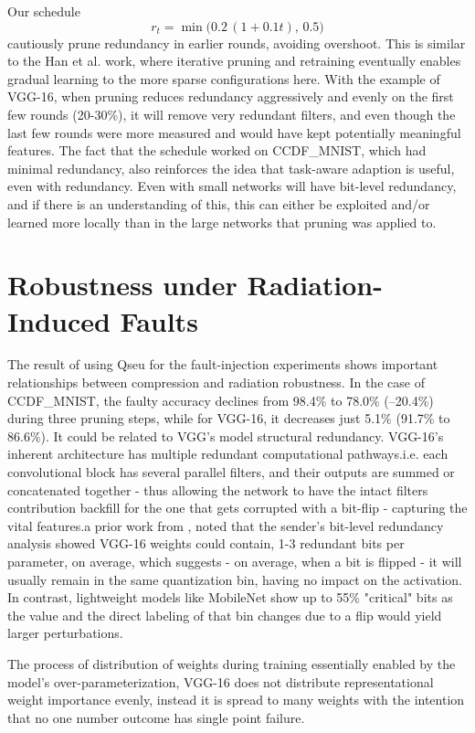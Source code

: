 Our schedule \[r_t = \min\bigl(0.2\,(1+0.1t),\,0.5\bigr)\]cautiously prune redundancy in earlier rounds, avoiding overshoot. This is similar to the Han et al. work, where iterative pruning and retraining eventually enables gradual learning to the more sparse configurations here. With the example of VGG-16, when pruning reduces redundancy aggressively and evenly on the first few rounds (20-30\%), it will remove very redundant filters, and even though the last few rounds were more measured and would have kept potentially meaningful features. The fact that the schedule worked on CCDF\_MNIST, which had minimal redundancy, also reinforces the idea that task-aware adaption is useful, even with redundancy. Even with small networks \cite{Catalan2025} will have bit-level redundancy, and if there is an understanding of this, this can either be exploited and/or learned more locally than in the large networks that pruning was applied to.

\section{Robustness under Radiation-Induced Faults}

The result of using Q\gls{seu} for the fault-injection experiments shows important relationships between compression and radiation robustness. In the case of CCDF\_MNIST, the faulty accuracy declines from 98.4\% to 78.0\% (–20.4\%) during three pruning steps, while for VGG-16, it decreases just 5.1\% (91.7\% to 86.6\%). 
It could be related to VGG's model structural redundancy. VGG-16's inherent architecture has multiple redundant computational pathways.i.e. each convolutional block has several parallel filters, and their outputs are summed or concatenated together - thus allowing the network to have the intact filters contribution backfill for the one that gets corrupted with a bit-flip - capturing the vital features.a prior work from \cite{Catalan2025}, noted that the sender's bit-level redundancy analysis showed VGG-16 weights could contain, 1-3 redundant bits per parameter, on average, which suggests - on average, when a bit is flipped - it will usually remain in the same quantization bin, having no impact on the activation. In contrast, lightweight models like MobileNet show up to 55\% "critical" bits as the value and the direct labeling of that bin changes due to a flip would yield larger perturbations.

The process of distribution of weights during training essentially enabled by the model's over-parameterization, VGG-16 does not distribute representational weight importance evenly, instead it is spread to many weights with the intention that no one number outcome has single point failure. 

